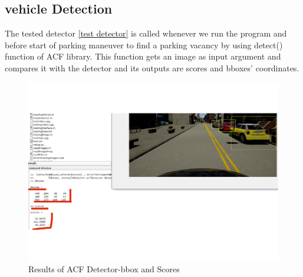 \subsection{vehicle Detection} \label{car detection}
The tested detector \ref{test detector} is called whenever we run the program and before start of parking maneuver to find a parking vacancy by using detect() function of ACF library. This function gets an image as input argument and compares it with the detector and its outputs are scores and bboxes' coordinates. 
\begin{figure}
    \includegraphics[width=12cm, height=8cm]{images/bboxesAndScores.pdf} 
    \caption{Results of ACF Detector-\acrfull{bbox} and Scores}
    \label{fig:BboxesAndScores}
\end{figure}

